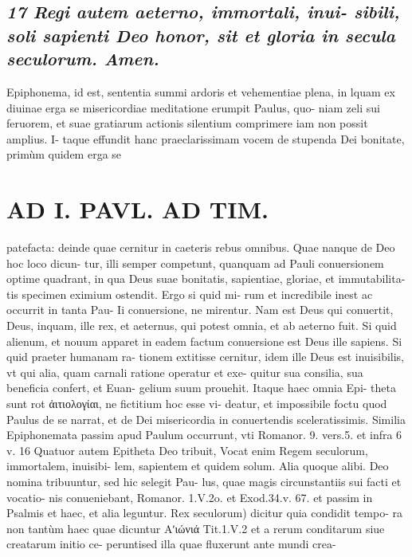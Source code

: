 \documentclass{article}
\begin{document}
\begin{pages}
\subsection*{\textit{17 Regi autem aeterno, immortali, inui- sibili, soli sapienti Deo honor, sit et gloria in secula seculorum. Amen. }}\pstart Epiphonema, id est, sententia summi ardoris et vehementiae plena, in lquam ex diuinae erga se misericordiae meditatione erumpit Paulus, quo- niam zeli sui feruorem, et suae gratiarum actionis silentium comprimere iam non possit amplius. I- taque effundit hanc praeclarissimam vocem de stupenda Dei bonitate, primùm quidem erga se  \pend
\section*{AD I. PAVL. AD TIM. }
\marginpar{[ p.30 ]}\pstart patefacta: deinde quae cernitur in caeteris rebus omnibus. Quae nanque de Deo hoc loco dicun- tur, illi semper competunt, quanquam ad Pauli conuersionem optime quadrant, in qua Deus suae bonitatis, sapientiae, gloriae, et immutabilita- tis specimen eximium ostendit. Ergo si quid mi- rum et incredibile inest ac occurrit in tanta Pau- Ii conuersione, ne mirentur. Nam est Deus qui conuertit, Deus, inquam, ille rex, et aeternus, qui potest omnia, et ab aeterno fuit. Si quid alienum, et nouum apparet in eadem factum conuersione est Deus ille sapiens. Si quid praeter humanam ra- tionem extitisse cernitur, idem ille Deus est inuisibilis, vt qui alia, quam carnali ratione operatur et exe- quitur sua consilia, sua beneficia confert, et Euan- gelium suum prouehit. Itaque haec omnia Epi- theta sunt rot ἀιτιολογίαι, ne fictitium hoc esse vi- deatur, et impossibile foctu quod Paulus de se narrat, et de Dei misericordia in conuertendis sceleratissimis.  \pend\pstart Similia Epiphonemata passim apud Paulum occurrunt, vti Romanor. 9. vers.5. et infra 6 v. 16  \pend\pstart Quatuor autem Epitheta Deo tribuit, Vocat enim Regem seculorum, immortalem, inuisibi- lem, sapientem et quidem solum. Alia quoque alibi. Deo nomina tribuuntur, sed hic selegit Pau- lus, quae magis circunstantiis sui facti et vocatio- nis conueniebant, Romanor. 1.V.2o. et Exod.34.v. 67. et passim in Psalmis et haec, et alia leguntur.  \pend\pstart Rex seculorum) dicitur quia condidit tempo- ra non tantùm haec quae dicuntur Αʹιώνιά  Tit.1.V.2 et a rerum conditarum siue creatarum initio ce- peruntised illa quae fluxerunt ante mundi crea-  \pend

\end{pages}
\end{document}
